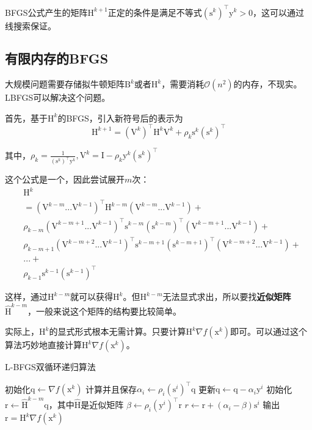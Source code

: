 \documentclass[a4paper]{D:/repositories/MyDGP/latex/PaperReadingLog}
\begin{document}
BFGS公式产生的矩阵$\mathrm{H}^{k+1}$正定的条件是满足不等式$(\mathrm{s}^k)^\top \mathrm{y}^k>0$，这可以通过线搜索保证。


\subsection{有限内存的BFGS}
大规模问题需要存储拟牛顿矩阵$\mathrm{B}^k$或者$\mathrm{H}^k$，需要消耗$\mathcal{O}(n^2)$的内存，不现实。LBFGS可以解决这个问题。

首先，基于$\mathrm{H}^k$的BFGS，引入新符号后的表示为
$$
\mathrm{H}^{k+1}=(\mathrm{V}^k)^\top \mathrm{H}^k\mathrm{V}^k+\rho_k\mathrm{s}^k(\mathrm{s}^k)^\top
$$

其中，$\rho_k=\frac{1}{(\mathrm{s}^k)^\top \mathrm{y}^k}, \mathrm{V}^k=\mathrm{I}-\rho_k\mathrm{y}^k(\mathrm{s}^k)^\top$

这个公式是一个，因此尝试展开$m$次：
$$
\begin{aligned}
   &\mathrm{H}^k\\
   &=(\mathrm{V}^{k-m}...\mathrm{V}^{k-1})^\top \mathrm{H}^{k-m}(\mathrm{V}^{k-m}...\mathrm{V}^{k-1})+\\
   &\rho_{k-m}(\mathrm{V}^{k-m+1}...\mathrm{V}^{k-1})^\top \mathrm{s}^{k-m}(\mathrm{s}^{k-m})^\top (\mathrm{V}^{k-m+1}...\mathrm{V}^{k-1})+\\
   &\rho_{k-m+1}(\mathrm{V}^{k-m+2}...\mathrm{V}^{k-1})^\top \mathrm{s}^{k-m+1}(\mathrm{s}^{k-m+1})^\top (\mathrm{V}^{k-m+2}...\mathrm{V}^{k-1})+\\
   &...+\\
   &\rho_{k-1}\mathrm{s}^{k-1}(\mathrm{s}^{k-1})^\top
\end{aligned}
$$

这样，通过$\mathrm{H}^{k-m}$就可以获得$\mathrm{H}^k$。但$\mathrm{H}^{k-m}$无法显式求出，所以要找\textbf{近似矩阵}$\hat{\mathrm{H}}^{k-m}$，一般来说这个矩阵的结构要比较简单。

实际上，$\mathrm{H}^k$的显式形式根本无需计算。只要计算$\mathrm{H}^k\nabla f(\mathrm{x}^k)$即可。可以通过这个算法巧妙地直接计算$\mathrm{H}^k\nabla f(\mathrm{x}^k)$。

\begin{algorithm}[H]
	\caption{L-BFGS双循环递归算法} 
	\begin{algorithmic}[1]
		\STATE 初始化$\mathrm{q} \leftarrow \nabla f(\mathrm{x}^k)$ 
			\STATE 计算并且保存$\alpha_i\leftarrow\rho_i(\mathrm{s}^i)^\top \mathrm{q}$
			\STATE 更新$\mathrm{q}\leftarrow \mathrm{q}-\alpha_i\mathrm{y}^i$
		\ENDFOR
		\STATE 初始化$\mathrm{r}\leftarrow \hat{\mathrm{H}}^{k-m}\mathrm{q}$，其中$\hat{\mathrm{H}}$是近似矩阵
			\STATE $\beta\leftarrow\rho_i(\mathrm{y}^i)^\top \mathrm{r}$
			\STATE $r\leftarrow \mathrm{r}+(\alpha_i-\beta)\mathrm{s}^i$
		\ENDFOR
		\STATE 输出$\mathrm{r}=\mathrm{H}^k\nabla f(\mathrm{x}^k)$
	\end{algorithmic}
\end{algorithm}
\end{document}
